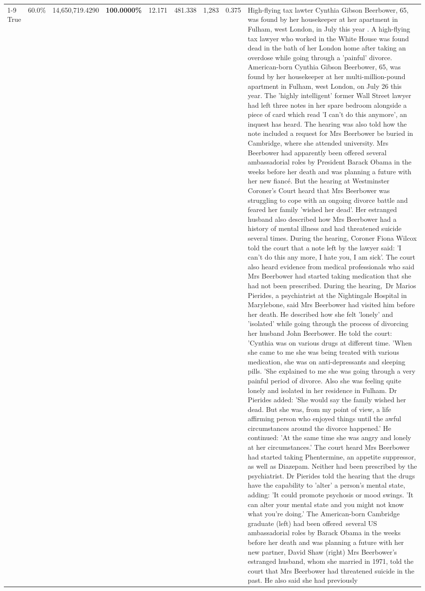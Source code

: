\begin{table}[H]
\begin{tabular}{lllrlllll}
\cline{1-9}
True & 60.0\% & 14,650,719.4290 & \bfseries \color{red} 100.0000\% & 12.171 & 481.338 & 1,283 & 0.375 & High-flying tax lawter Cynthia Gibson Beerbower, 65, was found by her housekeeper at her apartment in Fulham, west London, in July this year . A high-flying tax lawyer who worked in the White House was found dead in the bath of her London home after taking an overdose while going through a 'painful' divorce. American-born Cynthia Gibson Beerbower, 65, was found by her housekeeper at her multi-million-pound apartment in Fulham, west London, on July 26 this year. The 'highly intelligent' former Wall Street lawyer had left three notes in her spare bedroom alongside a piece of card which read 'I can't do this anymore', an inquest has heard. The hearing was also told how the note included a request for Mrs Beerbower be buried in Cambridge, where she attended university. Mrs Beerbower had apparently been offered several ambassadorial roles by President Barack Obama in the weeks before her death and was planning a future with her new fiancé. But the hearing at Westminster Coroner's Court heard that Mrs Beerbower was struggling to cope with an ongoing divorce battle and feared her family 'wished her dead'. Her estranged husband also described how Mrs Beerbower had a history of mental illness and had threatened suicide several times. During the hearing, Coroner Fiona Wilcox told the court that a note left by the lawyer said: 'I can't do this any more, I hate you, I am sick'. The court also heard evidence from medical professionals who said Mrs Beerbower had started taking medication that she had not been prescribed. During the hearing, Dr Marios Pierides, a psychiatrist at the Nightingale Hospital in Marylebone, said Mrs Beerbower had visited him before her death. He described how she felt 'lonely' and 'isolated' while going through the process of divorcing her husband John Beerbower. He told the court: 'Cynthia was on various drugs at different time. 'When she came to me she was being treated with various medication, she was on anti-depressants and sleeping pills. 'She explained to me she was going through a very painful period of divorce. Also she was feeling quite lonely and isolated in her residence in Fulham. Dr Pierides added: 'She would say the family wished her dead. But she was, from my point of view, a life affirming person who enjoyed things until the awful circumstances around the divorce happened.' He continued: 'At the same time she was angry and lonely at her circumstances.' The court heard Mrs Beerbower had started taking Phentermine, an appetite suppressor, as well as Diazepam. Neither had been prescribed by the psychiatrist. Dr Pierides told the hearing that the drugs have the capability to 'alter' a person's mental state, adding: 'It could promote psychosis or mood swings. 'It can alter your mental state and you might not know what you're doing.' The American-born Cambridge graduate (left) had been offered several US ambassadorial roles by Barack Obama in the weeks before her death and was planning a future with her new partner, David Shaw (right) Mrs Beerbower's estranged husband, whom she married in 1971, told the court that Mrs Beerbower had threatened suicide in the past. He also said she had previously 
\end{tabular}
\end{table}
